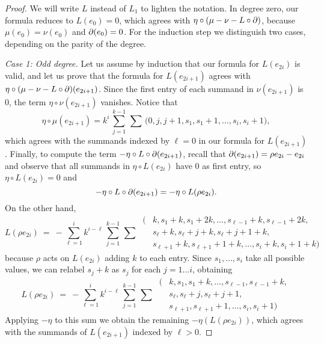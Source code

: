 \begin{proof}
    We will write $L$ instead of $L_1$ to lighten the notation. In degree zero, our formula reduces to $L(e_{0}) = 0$, which agrees with $\eta\circ (\mu - \nu - L\circ \operatorname{\partial})$, because $\mu(e_0) = \nu(e_0)$ and $\operatorname{\partial} (e_0) = 0$. For the induction step we distinguish two cases, depending on the parity of the degree.

    \medskip\noindent\emph{Case 1: Odd degree.} Let us assume by induction that our formula for $L(e_{2i})$ is valid, and let us prove that the formula for $L(e_{2i+1})$ agrees with $\eta\circ (\mu - \nu - L\circ \operatorname{\partial})(e_{2i+1})$. Since the first entry of each summand in $\nu(e_{2i+1})$ is $0$, the term $\eta \circ \nu(e_{2i+1})$ vanishes.
    Notice that
    \[
    \eta \circ \mu(e_{2i+1}) = k^{i} \, \sum_{j=1}^{k-1} \, \sum \, \big(0,j,j+1,s_1,s_1+1,\dots,s_i,s_i+1\big),
    \]
    which agrees with the summands indexed by $\ell=0$ in our formula for $L(e_{2i+1})$.
    Finally, to compute the term $-\eta\circ L\circ \operatorname{\partial}(e_{2i+1})$, recall that $\operatorname{\partial} (e_{2i+1}) = \rho e_{2i} - e_{2i}$ and observe that all summands in $\eta\circ L(e_{2i})$ have $0$ as first entry, so $\eta \circ L(e_{2i}) = 0$ and
    \[
        -\eta\circ L\circ \operatorname{\partial}(e_{2i+1})
        =
        -\eta\circ L(\rho e_{2i}).
    \]
    On the other hand,
    \[
    L(\rho e_{2i})  \ = \
    -\sum_{\ell = 1}^i k^{i-\ell} \, \sum_{j=1}^{k-1} \, \sum \
    \begin{aligned}
    	\big(&k,s_1+k,s_1+2k,\ldots,s_{\ell-1}+k,s_{\ell-1}+2k, \\
    	&s_{\ell}+k,s_{\ell}+j+k,s_{\ell}+j+1+k, \\
    	&s_{\ell+1}+k,s_{\ell+1}+1+k,\ldots,s_i+k,s_i+1+k\big)
    \end{aligned}
    \]
    because $\rho$ acts on $L(e_{2i})$ adding $k$ to each entry. Since $s_1,\ldots,s_i$ take all possible values, we can relabel $s_j+k$ as $s_j$ for each $j=1\ldots i$, obtaining
        \[
    L(\rho e_{2i})  \ = \
    -\sum_{\ell = 1}^i k^{i-\ell} \, \sum_{j=1}^{k-1} \, \sum \
    \begin{aligned}
    	\big(&k,s_1,s_1+k,\ldots,s_{\ell-1},s_{\ell-1}+k, \\
    	&s_{\ell},s_{\ell}+j,s_{\ell}+j+1, \\
    	&s_{\ell+1},s_{\ell+1}+1,\ldots,s_i,s_i+1\big)
    \end{aligned}
    \]
    \anibal{Doesn't seem to follow...}
    Applying $-\eta$ to this sum we obtain the remaining $-\eta(L(\rho e_{2i}))$, which agrees with the summands of $L(e_{2i+1})$ indexed by $\ell>0$.


\end{proof}
